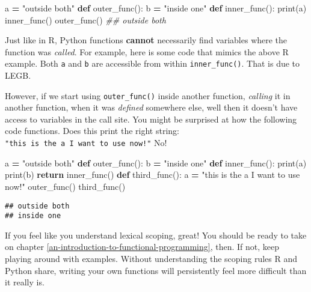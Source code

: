 \documentclass[12pt,krantz2]{krantz}
\makeatletter
\newenvironment{Shaded}{\begin{snugshade}}{\end{snugshade}}
\newcommand{\BuiltInTok}[1]{#1}
\newcommand{\CommentTok}[1]{\textcolor[rgb]{0.37,0.37,0.37}{\textit{#1}}}
\newcommand{\ControlFlowTok}[1]{\textcolor[rgb]{0.27,0.27,0.27}{\textbf{#1}}}
\newcommand{\KeywordTok}[1]{\textcolor[rgb]{0.27,0.27,0.27}{\textbf{#1}}}
\newcommand{\NormalTok}[1]{#1}
\newcommand{\OperatorTok}[1]{\textcolor[rgb]{0.43,0.43,0.43}{\textbf{#1}}}
\newcommand{\StringTok}[1]{\textcolor[rgb]{0.5,0.5,0.5}{#1}}
\newenvironment{kframe}{%
\medskip{}
\setlength{\fboxsep}{.8em}
 \def\at@end@of@kframe{}%
 \ifinner\ifhmode%
  \def\at@end@of@kframe{\end{minipage}}%
  \begin{minipage}{\columnwidth}%
 \fi\fi%
 \def\FrameCommand##1{\hskip\@totalleftmargin \hskip-\fboxsep
 \colorbox{shadecolor}{##1}\hskip-\fboxsep
     \hskip-\linewidth \hskip-\@totalleftmargin \hskip\columnwidth}%
 \MakeFramed {\advance\hsize-\width
   \@totalleftmargin\z@ \linewidth\hsize
   \@setminipage}}%
 {\par\unskip\endMakeFramed%
 \at@end@of@kframe}
\renewenvironment{Shaded}{\begin{kframe}}{\end{kframe}}
\makeatother
\begin{document}
\begin{Shaded}
\begin{Highlighting}[]
\NormalTok{a }\OperatorTok{=} \StringTok{"outside both"}
\KeywordTok{def}\NormalTok{ outer_func():}
\NormalTok{    b }\OperatorTok{=} \StringTok{"inside one"}
    \KeywordTok{def}\NormalTok{ inner_func():}
        \BuiltInTok{print}\NormalTok{(a) }
\NormalTok{    inner_func()}
\NormalTok{outer_func()}
\CommentTok{## outside both}
\end{Highlighting}
\end{Shaded}

Just like in R, Python functions \textbf{cannot} necessarily find variables where the function was \emph{called}. For example, here is some code that mimics the above R example. Both \texttt{a} and \texttt{b} are accessible from within \texttt{inner\_func()}. That is due to LEGB.

However, if we start using \texttt{outer\_func()} inside another function, \emph{calling} it in another function, when it was \emph{defined} somewhere else, well then it doesn't have access to variables in the call site. You might be surprised at how the following code functions. Does this print the right string: \texttt{"this\ is\ the\ a\ I\ want\ to\ use\ now!"} No!

\begin{Shaded}
\begin{Highlighting}[]
\NormalTok{a }\OperatorTok{=} \StringTok{"outside both"}
\KeywordTok{def}\NormalTok{ outer_func():}
\NormalTok{    b }\OperatorTok{=} \StringTok{"inside one"}
    \KeywordTok{def}\NormalTok{ inner_func():}
        \BuiltInTok{print}\NormalTok{(a) }
        \BuiltInTok{print}\NormalTok{(b)}
    \ControlFlowTok{return}\NormalTok{ inner_func() }
\KeywordTok{def}\NormalTok{ third_func():}
\NormalTok{    a }\OperatorTok{=} \StringTok{"this is the a I want to use now!"}
\NormalTok{    outer_func()}
\NormalTok{third_func() }
\end{Highlighting}
\end{Shaded}

\begin{verbatim}
## outside both
## inside one
\end{verbatim}

If you feel like you understand lexical scoping, great! You should be ready to take on chapter \ref{an-introduction-to-functional-programming}, then. If not, keep playing around with examples. Without understanding the scoping rules R and Python share, writing your own functions will persistently feel more difficult than it really is.
\end{document}
